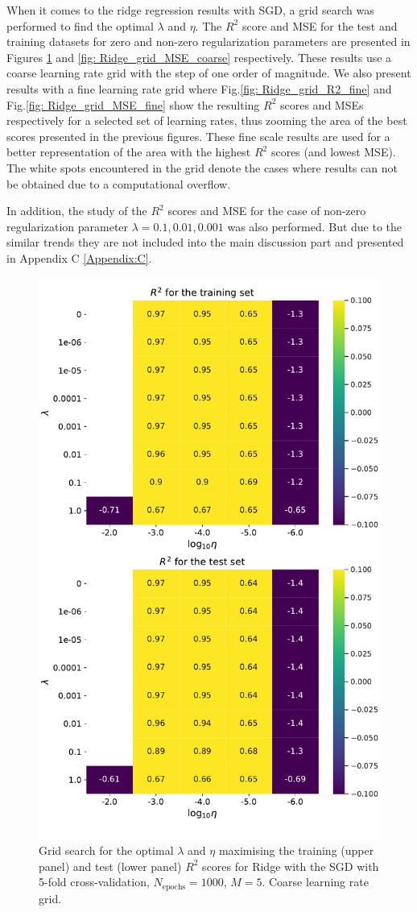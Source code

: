 \documentclass{emulateapj}
\begin{document}
When it comes to the ridge regression results with SGD, a grid search was performed to find the optimal $\lambda$ and $\eta$. The $R^{2}$ score and MSE for the test and training datasets  for zero and non-zero regularization parameters are presented in Figures \ref{fig: Ridge_grid_R2_coarse} and \ref{fig: Ridge_grid_MSE_coarse} respectively. These results use a coarse learning rate grid with the step of one order of magnitude. We also present results with a fine learning rate grid where Fig.\ref{fig: Ridge_grid_R2_fine} and Fig.\ref{fig: Ridge_grid_MSE_fine} show the resulting $R^{2}$ scores and MSEs respectively for a selected set of learning rates, thus zooming the area of the best scores presented in the previous figures. These fine scale results are used for a better representation of the area with the highest $R^{2}$ scores (and lowest MSE). The white spots encountered in the grid denote the cases where results can not be obtained due to a computational overflow.

In addition, the study of the $R^2$ scores and MSE for the case of non-zero regularization parameter $\lambda=0.1,0.01,0.001$ was also performed. But due to the similar trends they are not included into the main discussion part and presented in Appendix C \ref{Appendix:C}. 

\begin{figure}[h]
    \centering
    \includegraphics[width=.49\textwidth]{Figures/Ridge_R2.pdf}
    \caption{Grid search for the optimal $\lambda$ and $\eta$ maximising the training (upper panel) and test (lower panel) $R^2$ scores for Ridge with the SGD with 5-fold cross-validation, $N_{\mathrm{epochs}}=1000$, $M=5$. Coarse learning rate grid.}
    \label{fig: Ridge_grid_R2_coarse}
\end{figure}
\end{document}
